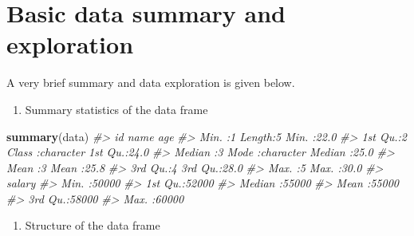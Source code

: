 \documentclass[
]{book}
\newenvironment{Shaded}{\begin{snugshade}}{\end{snugshade}}
\newcommand{\CommentTok}[1]{\textcolor[rgb]{0.56,0.35,0.01}{\textit{#1}}}
\newcommand{\FunctionTok}[1]{\textcolor[rgb]{0.13,0.29,0.53}{\textbf{#1}}}
\newcommand{\NormalTok}[1]{#1}
\providecommand{\tightlist}{%
  \setlength{\itemsep}{0pt}\setlength{\parskip}{0pt}}
\begin{document}
\section*{Basic data summary and exploration}\label{basic-data-summary-and-exploration}

A very brief summary and data exploration is given below.

\begin{enumerate}
\def\labelenumi{\arabic{enumi}.}
\tightlist
\item
  Summary statistics of the data frame
\end{enumerate}

\begin{Shaded}
\begin{Highlighting}[]
\FunctionTok{summary}\NormalTok{(data)}
\CommentTok{\#\textgreater{}        id        name                age      }
\CommentTok{\#\textgreater{}  Min.   :1   Length:5           Min.   :22.0  }
\CommentTok{\#\textgreater{}  1st Qu.:2   Class :character   1st Qu.:24.0  }
\CommentTok{\#\textgreater{}  Median :3   Mode  :character   Median :25.0  }
\CommentTok{\#\textgreater{}  Mean   :3                      Mean   :25.8  }
\CommentTok{\#\textgreater{}  3rd Qu.:4                      3rd Qu.:28.0  }
\CommentTok{\#\textgreater{}  Max.   :5                      Max.   :30.0  }
\CommentTok{\#\textgreater{}      salary     }
\CommentTok{\#\textgreater{}  Min.   :50000  }
\CommentTok{\#\textgreater{}  1st Qu.:52000  }
\CommentTok{\#\textgreater{}  Median :55000  }
\CommentTok{\#\textgreater{}  Mean   :55000  }
\CommentTok{\#\textgreater{}  3rd Qu.:58000  }
\CommentTok{\#\textgreater{}  Max.   :60000}
\end{Highlighting}
\end{Shaded}

\begin{enumerate}
\def\labelenumi{\arabic{enumi}.}
\setcounter{enumi}{1}
\tightlist
\item
  Structure of the data frame
\end{enumerate}

\begin{Shaded}
\end{Shaded}
\end{document}
